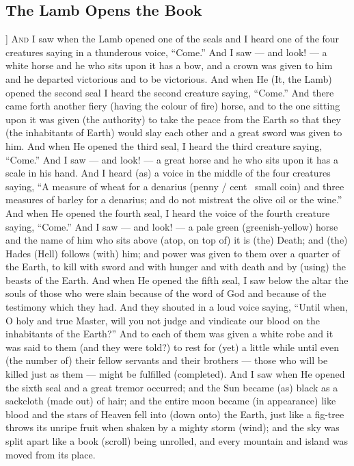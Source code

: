 \begin{pages}
\begin{Leftside}
        			\chapter{The Lamb Opens the Book}
				]
		\renewcommand{\LettrineFontHook}{\Zallmanfamily}
		\lettrine[lines=3]{A}{nd} I saw when the Lamb opened one of the seals and I heard one of the four creatures saying in a thunderous voice, “Come.” And I saw — and look! — a white horse and he who sits upon it has a bow, and a crown was given to him and he departed victorious and to be victorious.
		\pend
		\pstart
		And when He (It, the Lamb) opened the second seal I heard the second creature saying, “Come.” And there came forth another fiery (having the colour of fire) horse, and to the one sitting upon it was given (the authority) to take the peace from the Earth so that they (the inhabitants of Earth) would slay each other and a great sword was given to him.
		\pend
		\pstart
		And when He opened the third seal, I heard the third creature saying, “Come.” And I saw — and look! — a great horse and he who sits upon it has a scale in his hand. And I heard (as) a voice in the middle of the four creatures saying, “A measure of wheat for a denarius (penny / cent \rightarrow\ small coin) and three measures of barley for a denarius; and do not mistreat the olive oil or the wine.”
		\pend
		\pstart
		And when He opened the fourth seal, I heard the voice of the fourth creature saying, “Come.” And I saw — and look! — a pale green (greenish-yellow) horse and the name of him who sits above (atop, on top of) it is (the) Death; and (the) Hades (Hell) follows (with) him; and power was given to them over a quarter of the Earth, to kill with sword and with hunger and with death and by (using) the beasts of the Earth.
		\pend
		\pstart
		And when He opened the fifth seal, I saw below the altar the souls of those who were slain because of the word of God and because of the testimony which they had. And they shouted in a loud voice saying, “Until when, O holy and true Master, will you not judge and vindicate our blood on the inhabitants of the Earth?” And to each of them was given a white robe and it was said to them (and they were told?) to rest for (yet) a little while until even (the number of) their fellow servants and their brothers — those who will be killed just as them — might be fulfilled (completed).
		\pend
		\pstart
		And I saw when He opened the sixth seal and a great tremor occurred; and the Sun became (as) black as a sackcloth (made out) of hair; and the entire moon became (in appearance) like blood and the stars of Heaven fell into (down onto) the Earth, just like a fig-tree throws its unripe fruit when shaken by a mighty storm (wind); and the sky was split apart like a book (scroll) being unrolled, and every mountain and island was moved from its place.

\end{Leftside}
\end{pages}
